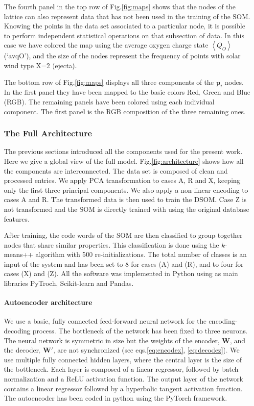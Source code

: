 The fourth panel in the top row of Fig.\ref{fig:maps} shows that the nodes of the lattice can also represent data that has not been used in the training of the SOM. Knowing the points in the data set associated to a particular node, it is possible to perform independent statistical operations on that subsection of data. In this case we have colored the map using the average oxygen charge state $\left<Q_{O}\right>$ (`avqO'), and the size of the nodes represent the frequency of points with solar wind type X=2 (ejecta).

The bottom row of Fig.\ref{fig:maps} displays all three components of the $\boldsymbol{p}_i$ nodes. In the first panel they have been mapped to the basic colors Red, Green and Blue (RGB). The remaining panels have been colored using each individual component. The first panel is the RGB composition of the three remaining ones.

\subsubsection{The Full Architecture}
The previous sections introduced all the components used for the present work. Here we give a global view of the full model. Fig.\ref{fig:architecture} shows how all the components are interconnected. The data set is composed of clean and processed entries. We apply PCA transformation to cases A, R and X, keeping only the first three principal components. We also apply a non-linear encoding to cases A and R. The transformed data is then used to train the DSOM. Case Z is not transformed and the SOM is directly trained with using the original database features.

After training, the code words of the SOM are then classified to group together nodes that share similar properties. This classification is done using the $k$-means++ algorithm with 500 re-initializations. The total number of classes is an input of the system and has been set to 8 for cases (A) and (R), and to four for cases (X) and (Z). All the software was implemented in Python using as main libraries PyTroch, Scikit-learn and Pandas.

\paragraph{Autoencoder architecture}
We use a basic, fully connected feed-forward neural network for the encoding-decoding process. The bottleneck of the network has been fixed to three neurons. The neural network is symmetric in size but the weights of the encoder, $\boldsymbol{W}$, and the decoder, $\boldsymbol{W'}$, are not synchronized (see eqs.\eqref{eq:encodex}, \eqref{eq:decodez}). We use multiple fully connected hidden layers, where the central layer is the size of the bottleneck. Each layer is composed of a linear regressor, followed by batch normalization and a ReLU activation function. The output layer of the network contains a linear regressor followed by a hyperbolic tangent activation function. The autoencoder has been coded in python using the PyTorch framework.

